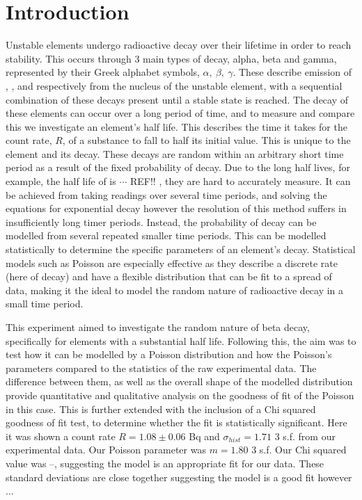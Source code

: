 \documentclass[11pt]{article}
\begin{document}
    \section{Introduction}
    Unstable elements undergo radioactive decay over their lifetime in order to reach stability. This occurs through 3 main types of decay, alpha, beta and gamma, represented by their Greek alphabet symbols, $\alpha,\  \beta,\ \gamma$.  These describe emission of , , and  respectively from the nucleus of the unstable element, with a sequential combination of these decays present until a stable state is reached. The decay of these elements can occur over a long period of time, and to measure and compare this we investigate an element's half life. This describes the time it takes for the count rate, $R$, of a substance to fall to half its initial value. This is unique to the element and its decay.
    These decays are random within an arbitrary short time period as a result of the fixed probability of decay. Due to the long half lives, for example, the half life of  is $\cdots$ REF!! , they are hard to accurately measure.  It can be achieved from taking readings over several time periods, and solving the equations for exponential decay however the resolution of this method suffers in insufficiently long timer periods. Instead, the probability of decay can be modelled from several repeated smaller time periods. This can be modelled statistically to determine the  specific parameters of an element's decay. Statistical models such as Poisson are especially effective as they describe a discrete rate (here of decay) and have a flexible distribution that can be fit to a spread of data, making it the ideal to model the random nature of radioactive decay in a small time period. 
    
    This experiment aimed to investigate the random nature of beta decay, specifically for elements with a substantial half life. Following this, the aim was to test how it can be modelled by a Poisson distribution and how the Poisson's parameters compared to the statistics of the raw experimental data. The difference between them, as well as the overall shape of the modelled distribution provide quantitative and qualitative analysis on the goodness of fit of the Poisson in this case. This is further extended with the inclusion of a Chi squared goodness of fit test, to determine whether the fit is statistically significant.  
    Here it was shown a count rate $ R = 1.08 \pm 0.06$ Bq and $\sigma_{hist} = 1.71$ 3 s.f. from our experimental data. Our Poisson parameter was $m = 1.80$ 3 s.f. Our Chi squared value was --, suggesting the model is an appropriate fit for our data. These standard deviations are close together suggesting the model is a good fit however ...
\end{document}
